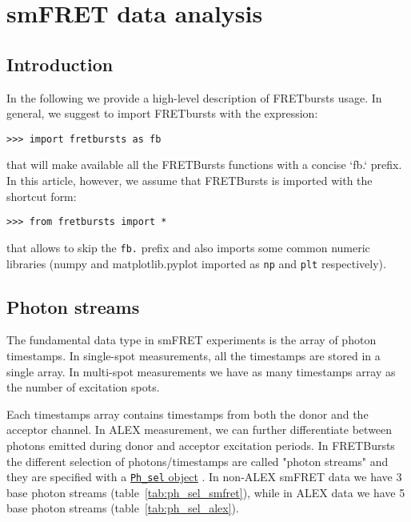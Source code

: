 \section{smFRET data analysis}

\subsection{Introduction}

In the following we provide a high-level description of FRETbursts usage. In general, we suggest to import FRETbursts with the expression:

\begin{verbatim}
>>> import fretbursts as fb
\end{verbatim}

that will make available all the FRETBursts functions with a concise `fb.` prefix. In this article, however, we assume that FRETBursts is imported with the shortcut form:

\begin{verbatim}
>>> from fretbursts import *
\end{verbatim}

that allows to skip the \verb|fb.| prefix and also imports some common numeric libraries (numpy and matplotlib.pyplot imported as \verb|np| and \verb|plt| respectively).

\subsection{Photon streams}

The fundamental data type in smFRET experiments is the array of photon timestamps. In single-spot measurements, all the timestamps are stored in a single array. In multi-spot measurements we have as many timestamps array as the number of excitation spots.

Each timestamps array contains timestamps from both the donor and the acceptor channel. In ALEX measurement, we can further differentiate between photons emitted during donor and acceptor excitation periods. In FRETBursts the different selection of photons/timestamps are called "photon streams" and they are specified with a \href{http://fretbursts.readthedocs.org/en/latest/data_class.html#module-fretbursts.ph_sel}{\texttt{Ph\_sel} object} . In non-ALEX smFRET data we have 3 base photon streams (table~\ref{tab:ph_sel_smfret}), while in ALEX data we have 5 base photon streams 
(table~\ref{tab:ph_sel_alex}).

